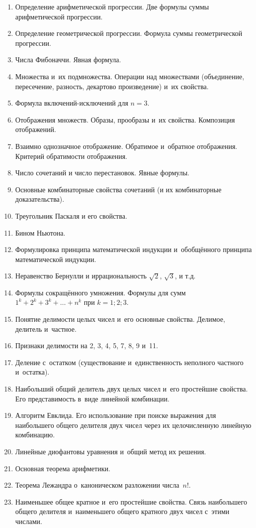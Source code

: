 \documentclass[a4paper,12pt]{article}
\begin{document}
\noindent
\begin{enumerate}
\setlength\itemsep{12truept}
\item Определение арифметической прогрессии. Две формулы суммы арифметической прогрессии.
\item Определение геометрической прогрессии. Формула суммы геометрической прогрессии.
\item Числа Фибоначчи. Явная формула.
\item Множества и~их подмножества. Операции над множествами (объединение, пересечение, разность, декартово произведение) и~их свойства.
\item Формула включений-исключений для $n=3$.
\item Отображения множеств. Образы, прообразы и~их свойства. Композиция отображений.
\item Взаимно однозначное отображение. Обратимое и~обратное отображения. Критерий обратимости отображения.
\item Число сочетаний и число перестановок. Явные формулы.
\item Основные комбинаторные свойства сочетаний (и их комбинаторные доказательства).
\item Треугольник Паскаля и его свойства.
\item Бином Ньютона.
\item Формулировка принципа математической индукции и~обобщённого принципа математической индукции.
\item Неравенство Бернулли и иррациональность $\sqrt2$, $\sqrt3$, и т.д.
\item Формулы сокращённого умножения. Формулы для сумм $1^k+2^k+3^k+\ldots+n^k$ при $k=1;2;3$.
\item Понятие делимости целых чисел и~его основные свойства. Делимое, делитель и~частное.
\item Признаки делимости на 2, 3, 4, 5, 7, 8, 9 и~11.
\item Деление с~остатком (существование и~единственность неполного частного и~остатка).
\item Наибольший общий делитель двух целых чисел и~его простейшие свойства. Его представимость в~виде линейной комбинации.
\item Алгоритм Евклида. Его использование при поиске выражения для наибольшего общего делителя двух чисел через их целочисленную линейную комбинацию.
\item Линейные диофантовы уравнения и~общий метод их решения.
\item Основная теорема арифметики.
\item Теорема Лежандра о~каноническом разложении числа~$n!$.
\item Наименьшее общее кратное и~его простейшие свойства. Связь наибольшего общего делителя и~наименьшего общего кратного двух чисел с~этими числами.
\end{enumerate}
\end{document}

